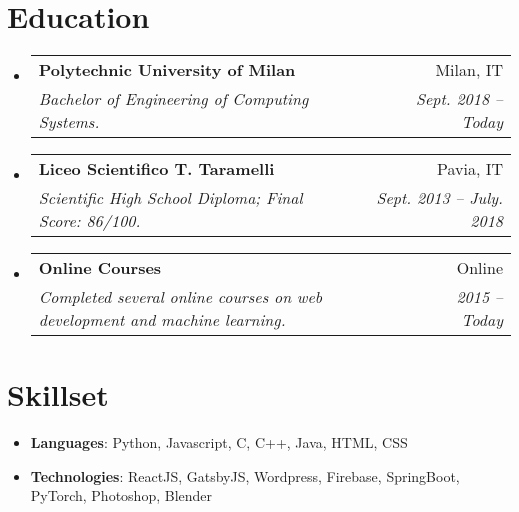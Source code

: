 \documentclass[letterpaper,11pt]{article}
\makeatletter
\newcommand{\resumeItem}[2]{
  \item\small{
    \textbf{#1}{: #2 \vspace{-2pt}}
  }
}
\newcommand{\resumeSubheading}[4]{
  \vspace{-1pt}\item
    \begin{tabular*}{0.97\textwidth}[t]{l@{\extracolsep{\fill}}r}
      \textbf{#1} & #2 \\
      \textit{\small#3} & \textit{\small #4} \\
    \end{tabular*}\vspace{-5pt}
}
\newcommand{\resumeSubItem}[2]{\resumeItem{#1}{#2}\vspace{-4pt}}
\newcommand{\resumeSubHeadingListStart}{\begin{itemize}[leftmargin=*]}
\newcommand{\resumeSubHeadingListEnd}{\end{itemize}}
\makeatother
\begin{document}
\section{Education}
\resumeSubHeadingListStart
\resumeSubheading
{Polytechnic University of Milan}{Milan, IT}
{Bachelor of Engineering of Computing Systems.}{Sept. 2018 -- Today}
\resumeSubheading
{Liceo Scientifico T. Taramelli}{Pavia, IT}
{Scientific High School Diploma; Final Score: 86/100.}{Sept. 2013 -- July. 2018}
\resumeSubheading
{Online Courses}{Online}
{Completed several online courses on web development and machine learning.}{2015 -- Today}
\resumeSubHeadingListEnd


\section{Skillset}
\resumeSubHeadingListStart
\resumeSubItem {Languages}
{Python, Javascript, C, C++, Java, HTML, CSS}
\resumeSubItem {Technologies}
{ReactJS, GatsbyJS, Wordpress, Firebase, SpringBoot, PyTorch, Photoshop, Blender}

\resumeSubHeadingListEnd


\end{document}
